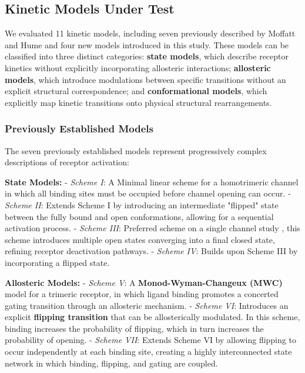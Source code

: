 \documentclass[pdflatex,sn-mathphys-num]{sn-jnl}%
\theoremstyle{thmstyleone}%
\theoremstyle{thmstyletwo}%
\theoremstyle{thmstylethree}%
\begin{document}
\subsection{Kinetic Models Under Test}

We evaluated 11 kinetic models, including seven previously described by Moffatt and Hume \cite{Moffatt_hume} and four new models introduced in this study. These models can be classified  into three distinct categories: \textbf{state models}, which describe receptor kinetics without explicitly incorporating allosteric interactions; \textbf{allosteric models}, which introduce modulations between specific transitions without an explicit structural correspondence; and \textbf{conformational models}, which explicitly map kinetic transitions onto physical structural rearrangements.

\subsubsection{Previously Established Models}

The seven previously established models represent progressively complex descriptions of receptor activation:

\textbf{State Models:}  
- \textit{Scheme I}: A Minimal linear scheme for a homotrimeric channel in which all binding sites must be occupied before channel opening can occur.  
- \textit{Scheme II}: Extends Scheme I by introducing an intermediate "flipped" state between the fully bound and open conformations, allowing for a sequential activation process.  
- \textit{Scheme III}: Preferred scheme on a single channel study \cite{properties_single_channe}, this scheme introduces multiple open states converging into a final closed state, refining receptor deactivation pathways.  
- \textit{Scheme IV}: Builds upon Scheme III by incorporating a flipped state.  

\textbf{Allosteric Models:}  
- \textit{Scheme V}: A \textbf{Monod-Wyman-Changeux (MWC)} model for a trimeric receptor, in which ligand binding promotes a concerted gating transition through an allosteric mechanism.  
- \textit{Scheme VI}: Introduces an explicit \textbf{flipping transition} that can be allosterically modulated. In this scheme, binding increases the probability of flipping, which in turn increases the probability of opening.  
- \textit{Scheme VII}: Extends Scheme VI by allowing flipping to occur independently at each binding site, creating a highly interconnected state network in which binding, flipping, and gating are coupled.  
\end{document}
